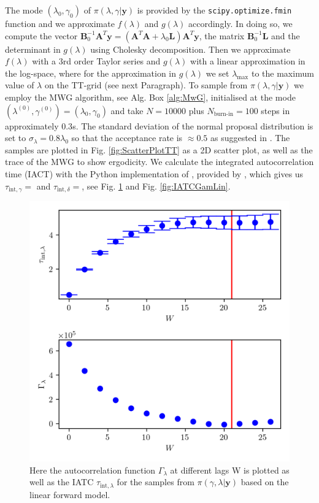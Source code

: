The mode $( \lambda_{0}, \gamma_0 )$ of $\pi(\lambda,\gamma| \bm{y})$ is provided by the \texttt{scipy.optimize.fmin} function and we approximate $f(\lambda)$  and $g(\lambda)$ accordingly.
In doing so, we compute the vector $\bm{B}_0^{-1}\bm{A}^T\bm{y} = (\bm{A}^T\bm{A} + \lambda_0 \bm{L})\bm{A}^T\bm{y} $, the matrix $\bm{B}_0^{-1}\bm{L}$ and the determinant in $g(\lambda)$ using Cholesky decomposition.
Then we approximate $f(\lambda)$ with a 3rd order Taylor series and $g(\lambda)$ with a linear approximation in the log-space, where for the approximation in $g(\lambda)$ we set $\lambda_{\text{max}}$ to the maximum value of $\lambda$ on the TT-grid (see next Paragraph).
To sample from $\pi( \lambda,\gamma| \bm{y})$ we employ the MWG algorithm, see Alg. Box \ref{alg:MwG}, initialised at the mode $(\lambda^{(0)} , \gamma^{(0)}  ) = ( \lambda_{0} , \gamma_{0}  )$ and take $N = 10000$ plus $N_{\text{burn-in}} = 100$ steps in approximately $0.3$s.
The standard deviation of the normal proposal distribution is set to $\sigma_{\lambda} = 0.8 \lambda_0$ so that the acceptance rate is $\approx 0.5$ as suggested in \cite{robertsLecNot}.
The samples are plotted in Fig. \ref{fig:ScatterPlotTT} as a 2D scatter plot, as well as the trace of the MWG to show ergodicity.
We calculate the integrated autocorrelation time (IACT) with the Python implementation of \cite{wolff2004monte}, provided by \cite{drikHesse}, which gives us $\tau_{\text{int}, \gamma} = $ and $\tau_{\text{int}, \delta} = $, see Fig. \ref{fig:IATCLamLin} and Fig. \ref{fig:IATCGamLin}.
\begin{figure}[h!]
	\centering
	\includegraphics{UwerrTauIntFirstO3lam.png}
	\caption[IATC of $\lambda$ samples from $\pi(\gamma, \lambda| \bm{y})$, for linear model.]{Here the autocorrelation function $\Gamma_{\lambda}$ at different lags W is plotted as well as the IATC $\tau_{\text{int},\lambda}$ for the samples from $\pi(\gamma, \lambda| \bm{y})$ based on the linear forward model.}
	\label{fig:IATCLamLin}
\end{figure}
\clearpage

